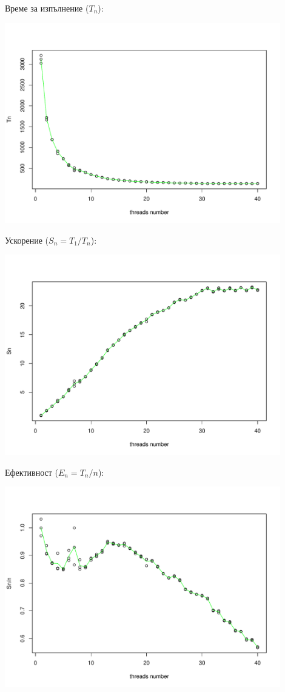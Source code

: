 \documentclass[12pt]{extarticle}
\begin{document}
\pagebreak
Време за изпълнение ($T_n$):
\begin{center}
\includegraphics[width=0.9\textwidth]{thread_graphs/Tn.pdf}
\end{center}

Ускорение ($S_n = T_1 / T_n$):
\begin{center}
\includegraphics[width=0.9\textwidth]{thread_graphs/Sn.pdf}
\end{center}

\pagebreak
Ефективност ($E_n = T_n / n$):
\begin{center}
\includegraphics[width=0.9\textwidth]{thread_graphs/Sn_n.pdf}
\end{center}
\end{document}
